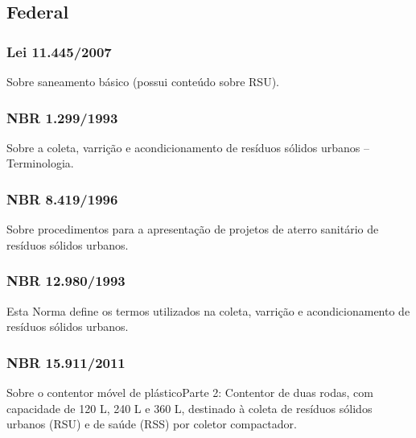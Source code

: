 \begin{subapend}
	\subsection{Federal}
	\begin{subsubapend}
		\item \subsubsection{Lei 11.445/2007}	
			Sobre saneamento básico (possui conteúdo sobre RSU).
		 \subsubsection{NBR 1.299/1993}	
			Sobre a coleta, varrição e acondicionamento de resíduos sólidos urbanos – Terminologia.
		 \subsubsection{NBR 8.419/1996}
			Sobre procedimentos para a apresentação de projetos de aterro sanitário de resíduos sólidos urbanos.
		 \subsubsection{NBR 12.980/1993}
			Esta Norma define os termos utilizados na coleta, varrição e acondicionamento de resíduos sólidos urbanos.
		 \subsubsection{NBR 15.911/2011}
			Sobre o contentor móvel de plásticoParte 2: Contentor de duas rodas, com capacidade de 120 L, 240 L e 360 L, destinado à coleta de resíduos sólidos urbanos (RSU) e de saúde (RSS) por coletor compactador.
	\end{subsubapend}
\end{subapend}


